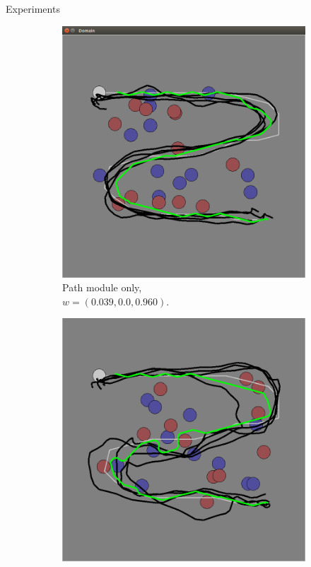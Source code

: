 \documentclass[final]{beamer}
\begin{document}
\begin{frame}{}
\begin{textblock}{37}
\begin{block}{Experiments}
\begin{figure}[h]
\centering
\begin{subfigure}[b]{0.4\textwidth}
\includegraphics[width=\textwidth]{task_1.png}
\caption{Path module only,\\$w = (0.039, 0.0, 0.960)$. }
\end{subfigure}
\begin{subfigure}[b]{0.4\textwidth}
\includegraphics[width=\textwidth]{task_2.png}

\end{subfigure}
\end{figure}
\end{block}
\end{textblock}
\end{frame}
\end{document}
